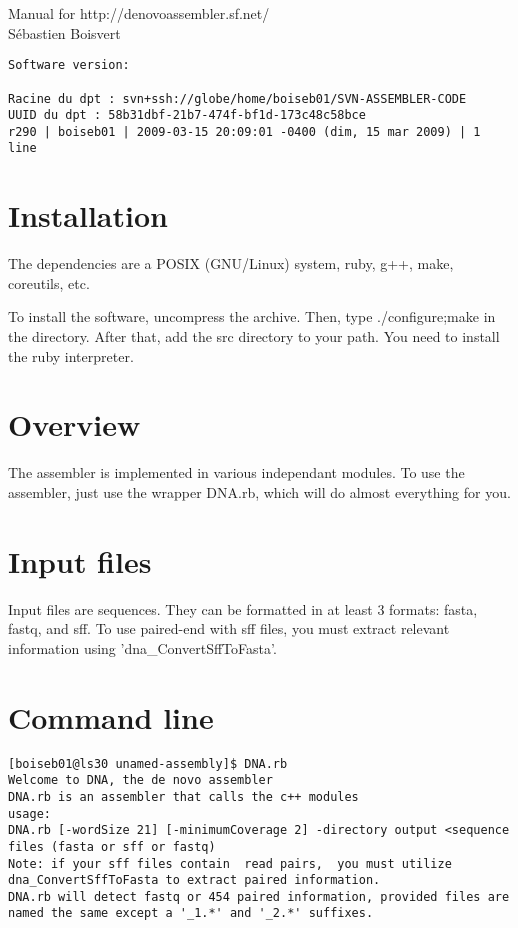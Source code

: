 \documentclass{article}
\begin{document}
Manual for http://denovoassembler.sf.net/ \\
Sébastien Boisvert \\

\begin{verbatim}
Software version:

Racine du dpt : svn+ssh://globe/home/boiseb01/SVN-ASSEMBLER-CODE
UUID du dpt : 58b31dbf-21b7-474f-bf1d-173c48c58bce
r290 | boiseb01 | 2009-03-15 20:09:01 -0400 (dim, 15 mar 2009) | 1 line
\end{verbatim}


\tableofcontents
\section{Installation}

The dependencies are a POSIX (GNU/Linux) system, ruby, g++, make, coreutils, etc.

To install the software, uncompress the archive. Then, type ./configure;make in
the directory. After that, add the src directory to your path.
You need to install the ruby interpreter.

\section{Overview}

The assembler is implemented in various independant modules.
To use the assembler, just use the wrapper DNA.rb, which will
do almost everything for you.

\section{Input files}

Input files are sequences. They can be formatted in at least 3 formats: fasta, fastq, and sff.
To use paired-end with sff files, you must extract relevant information using
'dna\_ConvertSffToFasta'.

\section{Command line}

\begin{verbatim}
[boiseb01@ls30 unamed-assembly]$ DNA.rb 
Welcome to DNA, the de novo assembler
DNA.rb is an assembler that calls the c++ modules
usage:
DNA.rb [-wordSize 21] [-minimumCoverage 2] -directory output <sequence files (fasta or sff or fastq)
Note: if your sff files contain  read pairs,  you must utilize dna_ConvertSffToFasta to extract paired information.
DNA.rb will detect fastq or 454 paired information, provided files are named the same except a '_1.*' and '_2.*' suffixes.
\end{verbatim}
\end{document}
